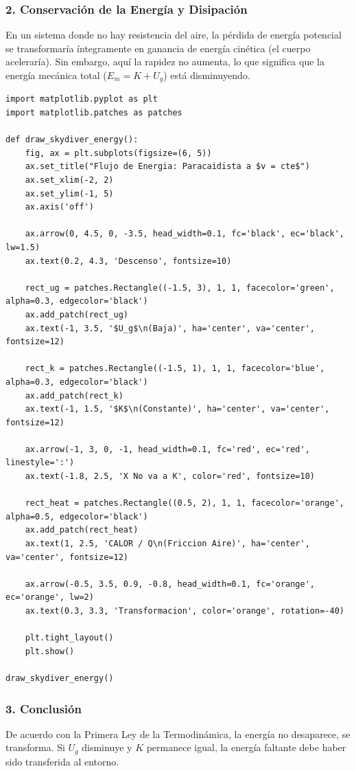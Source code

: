\documentclass[12pt, a4paper]{article}
\begin{document}
\subsubsection*{2. Conservación de la Energía y Disipación}
En un sistema donde no hay resistencia del aire, la pérdida de energía potencial se transformaría íntegramente en ganancia de energía cinética (el cuerpo aceleraría). Sin embargo, aquí la rapidez no aumenta, lo que significa que la energía mecánica total ($E_m = K + U_g$) está disminuyendo.

\begin{lstlisting}
import matplotlib.pyplot as plt
import matplotlib.patches as patches

def draw_skydiver_energy():
    fig, ax = plt.subplots(figsize=(6, 5))
    ax.set_title("Flujo de Energia: Paracaidista a $v = cte$")
    ax.set_xlim(-2, 2)
    ax.set_ylim(-1, 5)
    ax.axis('off')

    ax.arrow(0, 4.5, 0, -3.5, head_width=0.1, fc='black', ec='black', lw=1.5)
    ax.text(0.2, 4.3, 'Descenso', fontsize=10)

    rect_ug = patches.Rectangle((-1.5, 3), 1, 1, facecolor='green', alpha=0.3, edgecolor='black')
    ax.add_patch(rect_ug)
    ax.text(-1, 3.5, '$U_g$\n(Baja)', ha='center', va='center', fontsize=12)

    rect_k = patches.Rectangle((-1.5, 1), 1, 1, facecolor='blue', alpha=0.3, edgecolor='black')
    ax.add_patch(rect_k)
    ax.text(-1, 1.5, '$K$\n(Constante)', ha='center', va='center', fontsize=12)

    ax.arrow(-1, 3, 0, -1, head_width=0.1, fc='red', ec='red', linestyle=':')
    ax.text(-1.8, 2.5, 'X No va a K', color='red', fontsize=10)

    rect_heat = patches.Rectangle((0.5, 2), 1, 1, facecolor='orange', alpha=0.5, edgecolor='black')
    ax.add_patch(rect_heat)
    ax.text(1, 2.5, 'CALOR / Q\n(Friccion Aire)', ha='center', va='center', fontsize=12)

    ax.arrow(-0.5, 3.5, 0.9, -0.8, head_width=0.1, fc='orange', ec='orange', lw=2)
    ax.text(0.3, 3.3, 'Transformacion', color='orange', rotation=-40)

    plt.tight_layout()
    plt.show()

draw_skydiver_energy()
\end{lstlisting}

\subsubsection*{3. Conclusión}
De acuerdo con la Primera Ley de la Termodinámica, la energía no desaparece, se transforma. Si $U_g$ disminuye y $K$ permanece igual, la energía faltante debe haber sido transferida al entorno. 
\end{document}
